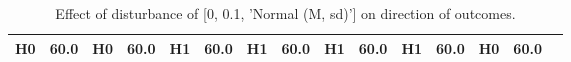\begin{table}
\begin{tabular}{l|cc|cc|cc|cc|cc|cc|cc}
\cellcolor{Bittersweet}H0&\cellcolor{Bittersweet}60.0&\cellcolor{Bittersweet}H0&\cellcolor{Bittersweet}60.0&\cellcolor{Bittersweet}H1&\cellcolor{Bittersweet}60.0&\cellcolor{Bittersweet}H1&\cellcolor{Bittersweet}60.0&\cellcolor{Bittersweet}H1&\cellcolor{Bittersweet}60.0&\cellcolor{Bittersweet}H1&\cellcolor{Bittersweet}60.0&\cellcolor{Bittersweet}H0&\cellcolor{Bittersweet}60.0\\\bottomrule\end{tabular}\caption{Effect of disturbance of [0, 0.1, 'Normal (M, sd)'] on direction of outcomes.}\end{table}